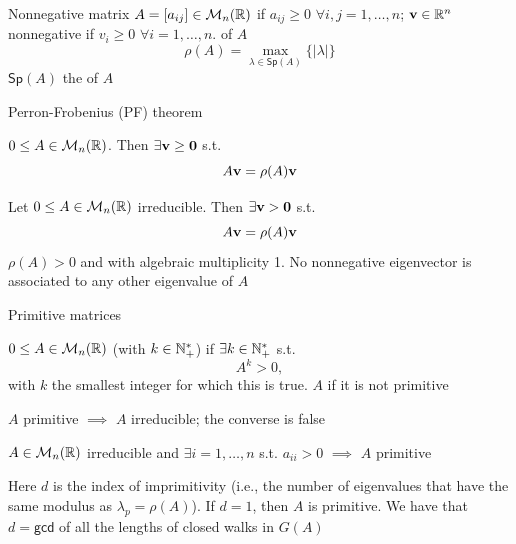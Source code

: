 \documentclass[aspectratio=43]{beamer}
\begin{document}
\begin{frame}{Nonnegative matrix}
\vfill
$A=[a_{ij}]\in\mathcal{M}_n(\mathbb{R})$  if $a_{ij}\geq 0$ $\forall i,j=1,\ldots,n$; $\mathbf{v}\in\mathbb{R}^n$ nonnegative if $v_i\geq 0$ $\forall i=1,\ldots,n$.   of $A$
\[
\rho(A) = \max_{\lambda\in\mathsf{Sp}(A)}\{|\lambda|\}
\]
$\mathsf{Sp}(A)$ the  of $A$
\end{frame}

\begin{frame}{Perron-Frobenius (PF) theorem}
\begin{theorem}
$0\leq A\in\mathcal{M}_n(\mathbb{R})$. Then $\exists\bv\geq\b0$ s.t. 
\[
	A\mathbf{v}=\rho(A)\mathbf{v}
\]
\end{theorem}
\vfill
\begin{theorem}
	\label{th:PF}
	Let $0\leq A\in \mathcal{M}_n(\mathbb{R})$ irreducible. Then $\exists\bv>\b0$ s.t.
	\[
		A\mathbf{v}=\rho(A)\mathbf{v}
	\]
	$\rho(A)>0$ and with algebraic multiplicity 1.
	No nonnegative eigenvector is associated to any other eigenvalue of $A$
\end{theorem}
\end{frame}



\begin{frame}{Primitive matrices}
\begin{definition}
$0\leq A\in\mathcal{M}_n(\mathbb{R})$  (with  $k\in \mathbb{N}_{+}^{*}$) if $\exists k\in \mathbb{N}_{+}^{*}$ s.t.
\[
A^k>0,
\]
with $k$ the smallest integer for which this is true.
$A$  if it is not primitive
\end{definition}
\vfill
$A$ primitive $\implies$ $A$ irreducible; the converse is false
\end{frame}

\begin{frame}
\begin{theorem}
	$A\in\mathcal{M}_n(\mathbb{R})$ irreducible and $\exists i=1,\ldots,n$ s.t. $a_{ii}>0$ $\implies$ $A$ primitive
\end{theorem}
\vfill
Here $d$ is the index of imprimitivity (i.e., the number of eigenvalues that have the same modulus as $\lambda_p=\rho(A)$). If $d=1$, then $A$ is primitive. We have that $d=\mathsf{gcd}$ of all the lengths of closed walks in $G(A)$
\end{frame}
\end{document}
